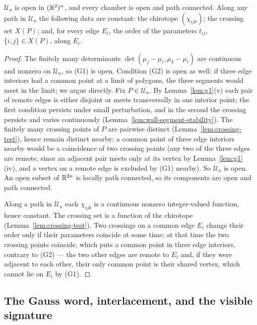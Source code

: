 \begin{proposition}[chambers]\label{prop:chambers}
$\mathcal U_n$ is open in $(\mathbb R^2)^n$, and every chamber is open and path
connected. Along any path in $\mathcal U_n$ the following data are constant:
the chirotope $(\chi_{ijk})$; the crossing set $X(P)$; and, for every edge
$E_i$, the order of the parameters $t_{ij}$, $\{i,j\}\in X(P)$, along $E_i$.
\end{proposition}
\begin{proof}
The finitely many determinants $\det(\mu_j-\mu_i,\mu_k-\mu_i)$ are continuous
and nonzero on $\mathcal U_n$, so (G1) is open. Condition (G2) is open as well:
if three edge interiors had a common point at a limit of polygons, the three
segments would meet in the limit; we argue directly. Fix $P\in\mathcal U_n$.
By Lemma~\ref{lem:g1}(v) each pair of remote edges is either disjoint or
meets transversally in one interior point; the first condition persists under
small perturbation, and in the second the crossing persists and varies
continuously (Lemma~\ref{lem:wall-segment-stability}).
The finitely many crossing points of $P$ are pairwise distinct
(Lemma~\ref{lem:crossing-test}), hence remain distinct nearby; a common point
of three edge interiors nearby would be a coincidence of two crossing points
(any two of the three edges are remote, since an adjacent pair meets only at
its vertex by Lemma~\ref{lem:g1}(iv), and a vertex on a remote edge is excluded
by (G1) nearby). So $\mathcal U_n$ is open. An open subset of $\mathbb R^{2n}$ is
locally path connected, so its components are open and path connected.

Along a path in $\mathcal U_n$ each $\chi_{ijk}$ is a continuous nonzero
integer-valued function, hence constant. The crossing set is a function of the
chirotope (Lemma~\ref{lem:crossing-test}). Two crossings on a common edge $E_i$
change their order only if their parameters coincide at some time; at that
time the two crossing points coincide, which puts a common point in three edge
interiors, contrary to (G2) --- the two other edges are remote to $E_i$ and,
if they were adjacent to each other, their only common point is their shared
vertex, which cannot lie on $E_i$ by (G1).
\end{proof}

\subsection{The Gauss word, interlacement, and the visible signature}

